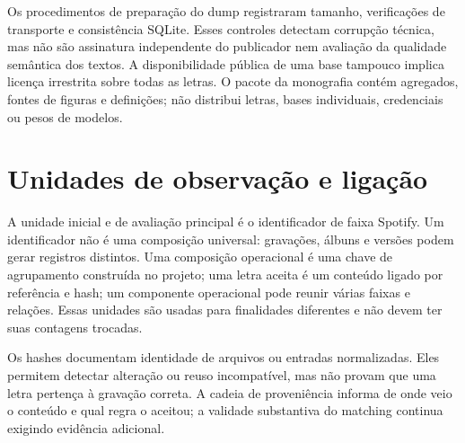 Os procedimentos de preparação do dump registraram tamanho, verificações de transporte e consistência SQLite. Esses controles detectam corrupção técnica, mas não são assinatura independente do publicador nem avaliação da qualidade semântica dos textos. A disponibilidade pública de uma base tampouco implica licença irrestrita sobre todas as letras. O pacote da monografia contém agregados, fontes de figuras e definições; não distribui letras, bases individuais, credenciais ou pesos de modelos.

\section{Unidades de observação e ligação}
A unidade inicial e de avaliação principal é o identificador de faixa Spotify. Um identificador não é uma composição universal: gravações, álbuns e versões podem gerar registros distintos. Uma composição operacional é uma chave de agrupamento construída no projeto; uma letra aceita é um conteúdo ligado por referência e hash; um componente operacional pode reunir várias faixas e relações. Essas unidades são usadas para finalidades diferentes e não devem ter suas contagens trocadas.

Os hashes documentam identidade de arquivos ou entradas normalizadas. Eles permitem detectar alteração ou reuso incompatível, mas não provam que uma letra pertença à gravação correta. A cadeia de proveniência informa de onde veio o conteúdo e qual regra o aceitou; a validade substantiva do matching continua exigindo evidência adicional.
